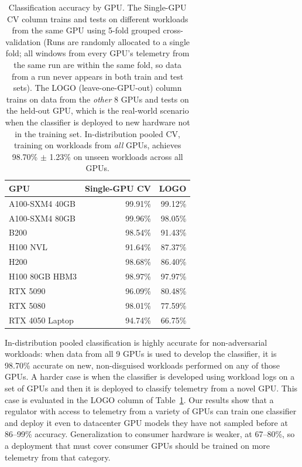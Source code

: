 \begin{table}[htbp]
\centering
\small
\begin{tabular}{lrr}
\toprule
\textbf{GPU} & \textbf{Single-GPU CV} & \textbf{LOGO} \\
\midrule
A100-SXM4 40GB & 99.91\% & 99.12\% \\
A100-SXM4 80GB & 99.96\% & 98.05\% \\
B200 & 98.54\% & 91.43\% \\
H100 NVL & 91.64\% & 87.37\% \\
H200 & 98.68\% & 86.40\% \\
H100 80GB HBM3 & 98.97\% & 97.97\% \\
RTX 5090 & 96.09\% & 80.48\% \\
RTX 5080 & 98.01\% & 77.59\% \\
RTX 4050 Laptop & 94.74\% & 66.75\% \\
\bottomrule
\end{tabular}
\caption{Classification accuracy by GPU. The Single-GPU CV column trains and tests on different workloads from the same GPU using 5-fold grouped cross-validation (Runs are randomly allocated to a single fold; all windows from every GPU's telemetry from the same run are within the same fold, so data from a run never appears in both train and test sets). The LOGO (leave-one-GPU-out) column trains on data from the \emph{other} 8 GPUs and tests on the held-out GPU, which is the real-world scenario when the classifier is deployed to new hardware not in the training set. In-distribution pooled CV, training on workloads from \emph{all} GPUs, achieves 98.70\% $\pm$ 1.23\% on unseen workloads across all GPUs.}
\label{tab:gpu}
\end{table}

In-distribution pooled classification is highly accurate for non-adversarial workloads: when data from all 9 GPUs is used to develop the classifier, it is 98.70\% accurate on new, non-disguised workloads performed on any of those GPUs. A harder case is when the classifier is developed using workload logs on a set of GPUs and then it is deployed to classify telemetry from a novel GPU. This case is evaluated in the LOGO column of Table~\ref{tab:gpu}. Our results show that a regulator with access to telemetry from a variety of GPUs can train one classifier and deploy it even to datacenter GPU models they have not sampled before at 86--99\% accuracy. Generalization to consumer hardware is weaker, at 67--80\%, so a deployment that must cover consumer GPUs should be trained on more telemetry from that category.

